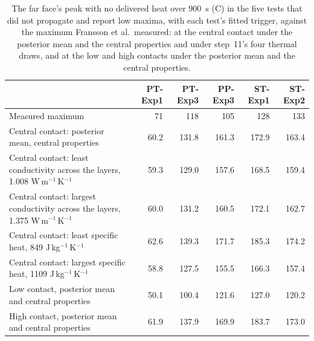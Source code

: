 \begin{table}[!htbp]
\centering
\footnotesize
\caption{The far face's peak with no delivered heat over 900~s (\textdegree C) in the five tests that did not propagate and report low maxima, with each test's fitted trigger, against the maximum Fransson et al.\ measured: at the central contact under the posterior mean and the central properties and under step~11's four thermal draws, and at the low and high contacts under the posterior mean and the central properties.}
\label{tab:s-farface}
\setlength{\tabcolsep}{3pt}
\begin{tabular}{>{\raggedright\arraybackslash}p{}rrrrr}
\toprule
 & PT-Exp1 & PT-Exp3 & PP-Exp3 & ST-Exp1 & ST-Exp2 \\
\midrule
Measured maximum & 71 & 118 & 105 & 128 & 133 \\
\midrule
Central contact: posterior mean, central properties & 60.2 & 131.8 & 161.3 & 172.9 & 163.4 \\
Central contact: least conductivity across the layers, 1.008 W\,m$^{-1}$\,K$^{-1}$ & 59.3 & 129.0 & 157.6 & 168.5 & 159.4 \\
Central contact: largest conductivity across the layers, 1.375 W\,m$^{-1}$\,K$^{-1}$ & 60.0 & 131.2 & 160.5 & 172.1 & 162.7 \\
Central contact: least specific heat, 849 J\,kg$^{-1}$\,K$^{-1}$ & 62.6 & 139.3 & 171.7 & 185.3 & 174.2 \\
Central contact: largest specific heat, 1109 J\,kg$^{-1}$\,K$^{-1}$ & 58.8 & 127.5 & 155.5 & 166.3 & 157.4 \\
\midrule
Low contact, posterior mean and central properties & 50.1 & 100.4 & 121.6 & 127.0 & 120.2 \\
High contact, posterior mean and central properties & 61.9 & 137.9 & 169.9 & 183.7 & 173.0 \\
\bottomrule
\end{tabular}
\end{table}
